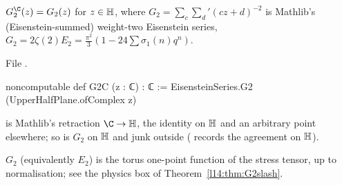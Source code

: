 \begin{definition}\label{l14:def:G2C}
$G_2^{\C}(z) = G_2(z)$ for $z\in\mathbb{H}$, where $G_2 = \sum_{c}\sum_{d}{}'(cz+d)^{-2}$ is Mathlib's (Eisenstein-summed)
weight-two Eisenstein series, $G_2 = 2\zeta(2)E_2 = \frac{\pi^2}{3}(1-24\sum\sigma_1(n)q^n)$.
\end{definition}
\noindent File .
\begin{leancode}
noncomputable def G2C (z : ℂ) : ℂ := EisensteinSeries.G2 (UpperHalfPlane.ofComplex z)
\end{leancode}
\begin{dictionary}
 is Mathlib's retraction $\C\to\lfourteenH$, the identity on $\mathbb{H}$ and an
arbitrary point elsewhere; so  is $G_2$ on $\mathbb{H}$ and junk outside ( records the agreement
on $\mathbb{H}$).
\end{dictionary}
\begin{physics}
$G_2$ (equivalently $E_2$) is the torus one-point function of the stress tensor, up to normalisation; see the physics box of Theorem~\ref{l14:thm:G2slash}.
\end{physics}

